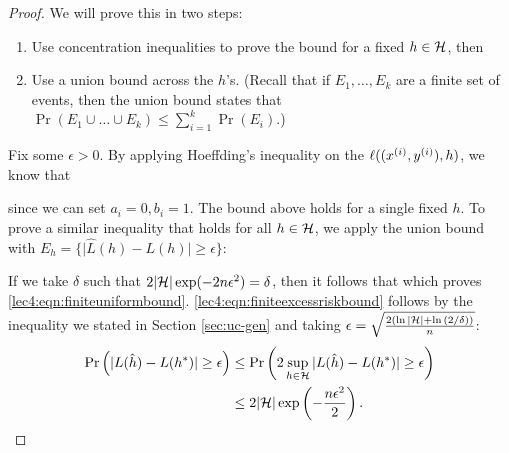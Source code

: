 \begin{proof}
We will prove this in two steps:
\begin{enumerate}
\item Use concentration inequalities to prove the bound for a fixed $h \in \cH$, then
\item Use a union bound across the $h$'s. (Recall that if $E_1, \dots, E_k$ are a finite set of events, then the union bound states that $\Pr ( E_1 \cup \dots \cup E_k) \leq \sum_{i = 1}^k \Pr(E_i)$.)
\end{enumerate}

Fix some $\epsilon > 0$. By applying Hoeffding's inequality on the $\ell( (x\sp{i}, y\sp{i}), h)$, we know that 

since we can set $a_i = 0, b_i = 1$. The bound above holds for a single fixed $h$. To prove a similar inequality that holds for all $h \in \cH$, we apply the union bound with $E_h = \{\vert \hat{L}(h) - L(h) \vert \geq \epsilon \}$:

If we take $\delta$ such that $2\vert \cH \vert \exp(-2n\epsilon^2) = \delta$, then it follows that 
which proves \eqref{lec4:eqn:finiteuniformbound}. \eqref{lec4:eqn:finiteexcessriskbound} follows by the inequality we stated in Section \ref{sec:uc-gen} and taking $\epsilon = \sqrt{\frac{ 2(\ln{\vert \cH \vert} + \ln{(2 / \delta)}) }{n}}$:
\begin{align}
\Pr \left( | L(\hat{h}) - L(h^{*}) | \geq \epsilon \right) &\leq \Pr \left( 2 \sup_{h \in \cH} | L(\hat{h}) - L(h^{*}) | \geq \epsilon \right) \\
&\leq 2 |\cH| \exp \left( -\frac{n\epsilon^2}{2} \right).
\end{align}
\end{proof}

